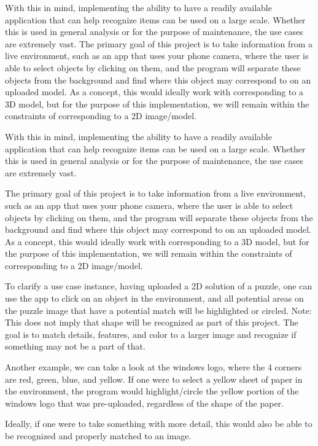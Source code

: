 \documentclass[letter,10pt]{article}
\begin{document}
\begin{multicols}{2}
            With this in mind, implementing the ability to have a readily available application that can help recognize items can be used on a large scale. Whether this is used in general analysis or for the purpose of maintenance, the use cases are extremely vast.
            The primary goal of this project is to take information from a live environment, such as an app that uses your phone camera, where the user is able to select objects by clicking on them, and the program will separate these objects from the background and find where this object may correspond to on an uploaded model. As a concept, this would ideally work with corresponding to a 3D model, but for the purpose of this implementation, we will remain within the constraints of corresponding to a 2D image/model. 
		\par
		With this in mind, implementing the ability to have a readily available application that can help recognize items can be used on a large scale. Whether this is used in general analysis or for the purpose of maintenance, the use cases are extremely vast.
        \par
        The primary goal of this project is to take information from a live environment, such as an app that uses your phone camera, where the user is able to select objects by clicking on them, and the program will separate these objects from the background and find where this object may correspond to on an uploaded model. As a concept, this would ideally work with corresponding to a 3D model, but for the purpose of this implementation, we will remain within the constraints of corresponding to a 2D image/model.
        \par
        To clarify a use case instance, having uploaded a 2D solution of a puzzle, one can use the app to click on an object in the environment, and all potential areas on the puzzle image that have a potential match will be highlighted or circled. Note: This does not imply that shape will be recognized as part of this project. The goal is to match details, features, and color to a larger image and recognize if something may not be a part of that.
        \par
        Another example, we can take a look at the windows logo, where the 4 corners are red, green, blue, and yellow. If one were to select a yellow sheet of paper in the environment, the program would highlight/circle the yellow portion of the windows logo that was pre-uploaded, regardless of the shape of the paper.
        \par
        Ideally, if one were to take something with more detail, this would also be able to be recognized and properly matched to an image.
        

\end{multicols}
\end{document}
